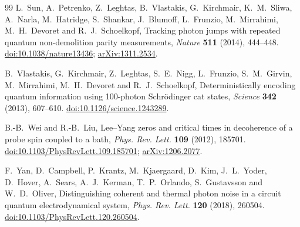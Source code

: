 \documentclass[11pt,reqno]{amsart}
\numberwithin{equation}{section}
\theoremstyle{plain}
\theoremstyle{definition}
\theoremstyle{remark}
\begin{document}
\begin{thebibliography}{99}
L.~Sun, A.~Petrenko, Z.~Leghtas, B.~Vlastakis, G.~Kirchmair, K.~M.~Sliwa, A.~Narla, M.~Hatridge, S.~Shankar, J.~Blumoff, L.~Frunzio, M.~Mirrahimi, M.~H.~Devoret and R.~J.~Schoelkopf, Tracking photon jumps with repeated quantum non-demolition parity measurements, \emph{Nature} \textbf{511} (2014), 444--448.
\href{https://doi.org/10.1038/nature13436}{doi:10.1038/nature13436};
\href{https://arxiv.org/abs/1311.2534}{arXiv:1311.2534}.


B.~Vlastakis, G.~Kirchmair, Z.~Leghtas, S.~E.~Nigg, L.~Frunzio, S.~M.~Girvin, M.~Mirrahimi, M.~H.~Devoret and R.~J.~Schoelkopf, Deterministically encoding quantum information using 100-photon Schr\"odinger cat states, \emph{Science} \textbf{342} (2013), 607--610.
\href{https://doi.org/10.1126/science.1243289}{doi:10.1126/science.1243289}.

B.-B.~Wei and R.-B.~Liu, Lee--Yang zeros and critical times in decoherence of a probe spin coupled to a bath, \emph{Phys. Rev. Lett.} \textbf{109} (2012), 185701.
\href{https://doi.org/10.1103/PhysRevLett.109.185701}{doi:10.1103/PhysRevLett.109.185701};
\href{https://arxiv.org/abs/1206.2077}{arXiv:1206.2077}.

F.~Yan, D.~Campbell, P.~Krantz, M.~Kjaergaard, D.~Kim, J.~L.~Yoder, D.~Hover, A.~Sears, A.~J.~Kerman, T.~P.~Orlando, S.~Gustavsson and W.~D.~Oliver, Distinguishing coherent and thermal photon noise in a circuit quantum electrodynamical system, \emph{Phys. Rev. Lett.} \textbf{120} (2018), 260504.
\href{https://doi.org/10.1103/PhysRevLett.120.260504}{doi:10.1103/PhysRevLett.120.260504}.

\end{thebibliography}
\end{document}

